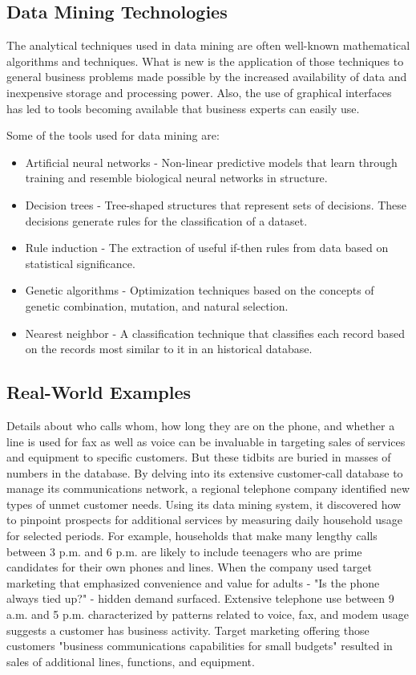 \subsection{Data Mining Technologies}
The analytical techniques used in data mining are often well-known mathematical algorithms and techniques. What is new is the application of those techniques to general business problems made possible by the increased availability of data and inexpensive storage and processing power. Also, the use of graphical interfaces has led to tools becoming available that business experts can easily use.

Some of the tools used for data mining are:

\begin{itemize}
\item Artificial neural networks - Non-linear predictive models that learn through training and resemble biological neural networks in structure.

\item Decision trees - Tree-shaped structures that represent sets of decisions. These decisions generate rules for the classification of a dataset.

\item Rule induction - The extraction of useful if-then rules from data based on statistical significance.

\item Genetic algorithms - Optimization techniques based on the concepts of genetic combination, mutation, and natural selection.

\item Nearest neighbor - A classification technique that classifies each record based on the records most similar to it in an historical database.
\end{itemize}

\subsection{Real-World Examples}
Details about who calls whom, how long they are on the phone, and whether a line is used for fax as well as voice can be invaluable in targeting sales of services and equipment to specific customers. But these tidbits are buried in masses of numbers in the database. By delving into its extensive customer-call database to manage its communications network, a regional telephone company identified new types of unmet customer needs. Using its data mining system, it discovered how to pinpoint prospects for additional services by measuring daily household usage for selected periods. For example, households that make many lengthy calls between 3 p.m. and 6 p.m. are likely to include teenagers who are prime candidates for their own phones and lines. When the company used target marketing that emphasized convenience and value for adults - "Is the phone always tied up?" - hidden demand surfaced. Extensive telephone use between 9 a.m. and 5 p.m. characterized by patterns related to voice, fax, and modem usage suggests a customer has business activity. Target marketing offering those customers "business communications capabilities for small budgets" resulted in sales of additional lines, functions, and equipment.

